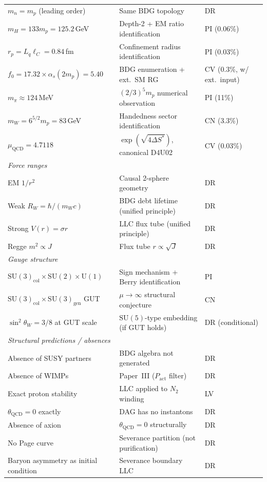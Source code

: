 \documentclass[11pt]{article}
\begin{document}
\begin{center}
\begin{tabular}{lll}
$m_n=m_p$ (leading order) & Same BDG topology & DR \\
$m_H=133 m_p=125.2$\,GeV & Depth-2 + EM ratio identification & PI (0.06\%) \\
$r_p=L_q\ell_C=0.84$\,fm & Confinement radius identification & PI (0.03\%) \\
$f_0=17.32\times\alpha_s(2m_p)=5.40$ & BDG enumeration + ext.\ SM RG & CV (0.3\%, w/ ext.\ input) \\
$m_\pi\approx 124$\,MeV & $(2/3)^5 m_p$ numerical observation & PI (11\%) \\
$m_W=6^{5/2}m_p=83$\,GeV & Handedness sector identification & CN (3.3\%) \\
$\mu_{\mathrm{QCD}}=4.7118$ & $\exp(\sqrt{4\Delta S^*})$, canonical D4U02 & CV (0.03\%) \\
\midrule
\multicolumn{3}{l}{\textit{Force ranges}} \\
EM $1/r^2$ & Causal 2-sphere geometry & DR \\
Weak $R_W=\hbar/(m_W c)$ & BDG debt lifetime (unified principle) & DR \\
Strong $V(r)=\sigma r$ & LLC flux tube (unified principle) & DR \\
Regge $m^2\propto J$ & Flux tube $r\propto\sqrt{J}$ & DR \\
\midrule
\multicolumn{3}{l}{\textit{Gauge structure}} \\
$\mathrm{SU}(3)_{\mathrm{col}}\times\mathrm{SU}(2)\times\mathrm{U}(1)$ & Sign mechanism + Berry identification & PI \\
$\mathrm{SU}(3)_{\mathrm{col}}\times\mathrm{SU}(3)_{\mathrm{gen}}$ GUT & $\mu\to\infty$ structural conjecture & CN \\
$\sin^2\theta_W=3/8$ at GUT scale & $\mathrm{SU}(5)$-type embedding (if GUT holds) & DR (conditional) \\
\midrule
\multicolumn{3}{l}{\textit{Structural predictions / absences}} \\
Absence of SUSY partners & BDG algebra not generated & DR \\
Absence of WIMPs & Paper~III ($P_{\mathrm{act}}$ filter) & DR \\
Exact proton stability & LLC applied to $N_2$ winding & LV \\
$\theta_{\mathrm{QCD}}=0$ exactly & DAG has no instantons & DR \\
Absence of axion & $\theta_{\mathrm{QCD}}=0$ structurally & DR \\
No Page curve & Severance partition (not purification) & DR \\
Baryon asymmetry as initial condition & Severance boundary LLC & DR \\
\bottomrule
\end{tabular}
\end{center}
\end{document}
